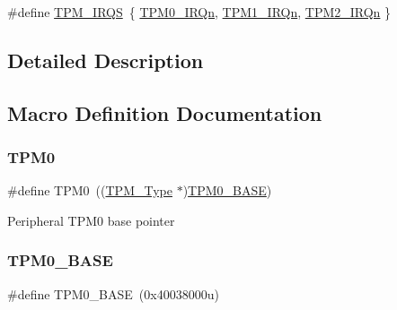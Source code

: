 \begin{DoxyCompactItemize}
\item 
\#define \mbox{\hyperlink{group___t_p_m___peripheral___access___layer_ga00286d54e4f8b9944c9fb9fc5acf54ba}{T\+P\+M\+\_\+\+I\+R\+QS}}~\{ \mbox{\hyperlink{group___interrupt__vector__numbers_gga666eb0caeb12ec0e281415592ae89083a8272b49ef18300d267156bac2c81f9c7}{T\+P\+M0\+\_\+\+I\+R\+Qn}}, \mbox{\hyperlink{group___interrupt__vector__numbers_gga666eb0caeb12ec0e281415592ae89083a2d109efab0332c2f73d46d5ed65995a8}{T\+P\+M1\+\_\+\+I\+R\+Qn}}, \mbox{\hyperlink{group___interrupt__vector__numbers_gga666eb0caeb12ec0e281415592ae89083aaf0e306be85f7d3cce57dbbba5e648cf}{T\+P\+M2\+\_\+\+I\+R\+Qn}} \}
\end{DoxyCompactItemize}


\subsection{Detailed Description}


\subsection{Macro Definition Documentation}
\mbox{\label{group___t_p_m___peripheral___access___layer_ga255cfcfa3e71e5e8bc0f8eb3272de220}} 
\subsubsection{\texorpdfstring{TPM0}{TPM0}}
{\footnotesize\ttfamily \#define T\+P\+M0~((\mbox{\hyperlink{struct_t_p_m___type}{T\+P\+M\+\_\+\+Type}} $\ast$)\mbox{\hyperlink{group___t_p_m___peripheral___access___layer_gafce6fdf5fb48d6c6b77a8c5a86ae50c2}{T\+P\+M0\+\_\+\+B\+A\+SE}})}

Peripheral T\+P\+M0 base pointer \mbox{\label{group___t_p_m___peripheral___access___layer_gafce6fdf5fb48d6c6b77a8c5a86ae50c2}} 
\subsubsection{\texorpdfstring{TPM0\_BASE}{TPM0\_BASE}}
{\footnotesize\ttfamily \#define T\+P\+M0\+\_\+\+B\+A\+SE~(0x40038000u)}

